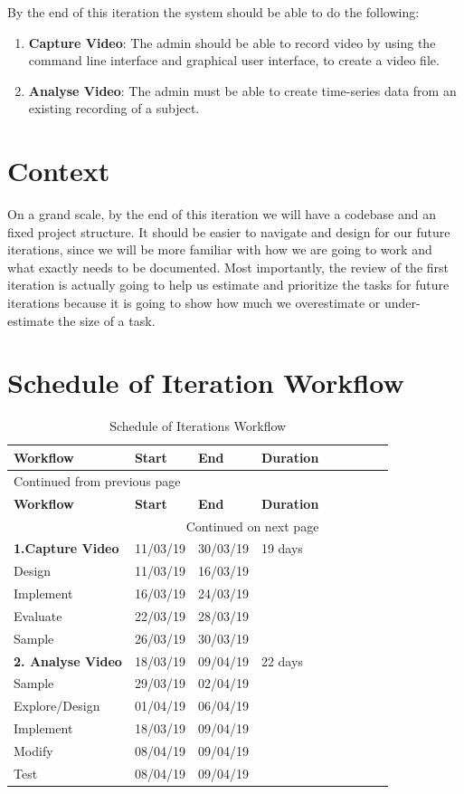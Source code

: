 \documentclass[12pt,a4paper,man]{report}
\begin{document}
By the end of this iteration the system should be able to do the following:
\begin{enumerate}
\item \textbf{Capture Video}: The admin should be able to record video by using the command line interface and graphical user interface, to create a video file.
\item \textbf{Analyse Video}: The admin must be able to create time-series data from an existing recording of a subject.
\end{enumerate}


\section{Context}
\label{sec:org6895689}
On a grand scale, by the end of this iteration we will have a codebase and an fixed project structure. It should be easier to navigate and design for our future iterations, since we will be more familiar with how we are going to work and what exactly needs to be documented. Most importantly, the review of the first iteration is actually going to help us estimate and prioritize the tasks for future iterations because it is going to show how much we overestimate or under-estimate the size of a task.

\section{Schedule of Iteration Workflow}
\label{sec:org7beca52}
\begin{longtable}{|l|l|l|l|l|l|l|lp{3cm}|}
\caption{\label{table:iterwork}
Schedule of Iterations Workflow}
\\
\hline
\textbf{Workflow} & \textbf{Start} & \textbf{End} & \textbf{Duration}\\
\hline
\endfirsthead
\multicolumn{4}{l}{Continued from previous page} \\
\hline

\textbf{Workflow} & \textbf{Start} & \textbf{End} & \textbf{Duration} \\

\hline
\endhead
\hline\multicolumn{4}{r}{Continued on next page} \\
\endfoot
\endlastfoot
\hline
\textbf{1.Capture Video} & 11/03/19 & 30/03/19 & 19 days\\
Design & 11/03/19 & 16/03/19 & \\
Implement & 16/03/19 & 24/03/19 & \\
Evaluate & 22/03/19 & 28/03/19 & \\
Sample & 26/03/19 & 30/03/19 & \\
\hline
\textbf{2. Analyse Video} & 18/03/19 & 09/04/19 & 22 days\\
Sample & 29/03/19 & 02/04/19 & \\
Explore/Design & 01/04/19 & 06/04/19 & \\
Implement & 18/03/19 & 09/04/19 & \\
Modify & 08/04/19 & 09/04/19 & \\
Test & 08/04/19 & 09/04/19 & \\
\hline
\end{longtable}
\end{document}
